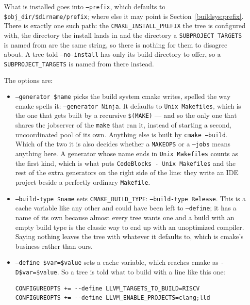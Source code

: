 \documentclass{article}
\begin{document}
What is installed goes into \texttt{--prefix}, which defaults to
\texttt{\$obj\_dir/\$dirname/prefix}; where else it may point is
Section~\ref{buildsys:prefix}.  There is exactly one such path: the
\texttt{CMAKE\_INSTALL\_PREFIX} the tree is configured with, the
directory the install lands in and the directory a
\texttt{SUBPROJECT\_TARGETS} is named from are the same string, so
there is nothing for them to disagree about.  A tree told
\texttt{--no-install} has only its build directory to offer, so a
\texttt{SUBPROJECT\_TARGETS} is named from there instead.

The options are:

\begin{itemize}
\item \texttt{--generator \$name} picks the build system cmake writes,
  spelled the way cmake spells it: \texttt{--generator Ninja}.  It
  defaults to \texttt{Unix Makefiles}, which is the one that gets
  built by a recursive \texttt{\$(MAKE)} --- and so the only one that
  shares the jobserver of the \texttt{make} that ran it, instead of
  starting a second, uncoordinated pool of its own.  Anything else is
  built by \texttt{cmake --build}.  Which of the two it is also
  decides whether a \texttt{MAKEOPS} or a \texttt{--jobs} means
  anything here.  A generator whose name ends in \texttt{Unix
  Makefiles} counts as the first kind, which is what puts
  \texttt{CodeBlocks - Unix Makefiles} and the rest of the extra
  generators on the right side of the line: they write an IDE project
  beside a perfectly ordinary \texttt{Makefile}.

\item \texttt{--build-type \$name} sets
  \texttt{CMAKE\_BUILD\_TYPE}: \texttt{--build-type Release}.  This is
  a cache variable like any other and could have been left to
  \texttt{--define}; it has a name of its own because almost every
  tree wants one and a build with an empty build type is the classic
  way to end up with an unoptimized compiler.  Saying nothing leaves
  the tree with whatever it defaults to, which is cmake's business
  rather than ours.

\item \texttt{--define \$var=\$value} sets a cache variable, which
  reaches cmake as \texttt{-D\$var=\$value}.  So a tree is told what
  to build with a line like this one:

\begin{verbatim}
CONFIGUREOPTS += --define LLVM_TARGETS_TO_BUILD=RISCV
CONFIGUREOPTS += --define LLVM_ENABLE_PROJECTS=clang;lld
\end{verbatim}


\end{itemize}
\end{document}
